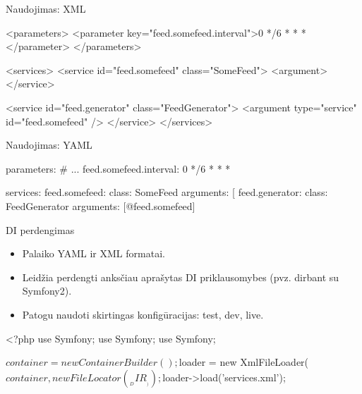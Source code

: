 \documentclass[12pt,a4paper]{beamer}
\begin{document}
\begin{frame}[fragile]{Naudojimas: XML}
\begin{xmlcode}
    <parameters>
        <parameter key="feed.somefeed.interval">0 */6 * * *</parameter>
    </parameters>

    <services>
        <service id="feed.somefeed" class="SomeFeed">
            <argument>%
        </service>

        <service id="feed.generator" class="FeedGenerator">
            <argument type="service" id="feed.somefeed" />
        </service>
    </services>
\end{xmlcode}
\end{frame}

\begin{frame}[fragile]{Naudojimas: YAML}
\begin{yamlcode}
    parameters:
        # ...
        feed.somefeed.interval: 0 */6 * * *

    services:
        feed.somefeed:
            class:     SomeFeed 
            arguments: [%
        feed.generator:
            class:     FeedGenerator
            arguments: [@feed.somefeed]
\end{yamlcode}
\end{frame}


\begin{frame}[fragile]{DI perdengimas}
    \begin{itemize}
        \item Palaiko YAML ir XML formatai.
        \item Leidžia perdengti anksčiau aprašytas DI priklausomybes (pvz. dirbant su Symfony2).
        \item Patogu naudoti skirtingas konfigūracijas: test, dev, live.
    \end{itemize}
    \vskip0.5cm
\begin{phpcode}
    <?php
    use Symfony\Component\DependencyInjection\ContainerBuilder;
    use Symfony\Component\Config\FileLocator;
    use Symfony\Component\DependencyInjection\Loader\XmlFileLoader;

    $container = new ContainerBuilder();
    $loader = new XmlFileLoader($container, new FileLocator(__DIR__));
    $loader->load('services.xml');
\end{phpcode}
\end{frame}
\end{document}
